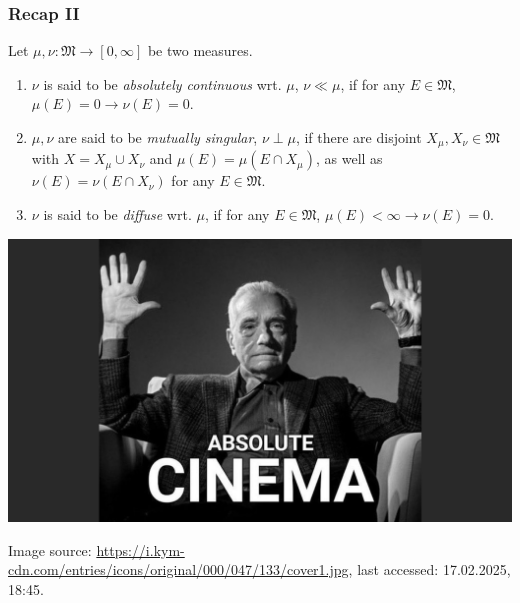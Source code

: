 \documentclass[10pt, hyperref={hidelinks}]{beamer}
\begin{document}
    \begin{frame}
        \frametitle{Recap II}

        \begin{definition} \label{def:basic_definitions}
            Let \(\mu, \nu\colon \mathfrak{M} \to [0, \infty]\) be two measures.
            \begin{enumerate}[label=(\roman*), wide]
                \item \(\nu\) is said to be \emph{absolutely continuous} wrt. \(\mu\), \(\nu \ll \mu\), if for any \(E \in \mathfrak{M}\), \(\mu(E) = 0 \rightarrow \nu(E) = 0\).
                \item \label{def:basic_definitions_2} \(\mu, \nu\) are said to be \emph{mutually singular}, \(\nu \perp \mu\), if there are disjoint \(X_\mu, X_\nu \in \mathfrak{M}\) with \(X = X_\mu \cup X_\nu\) and \(\mu(E) = \mu(E \cap X_\mu)\), as well as \(\nu(E) = \nu(E \cap X_\nu)\) for any \(E \in \mathfrak{M}\).
                \item \(\nu\) is said to be \emph{diffuse} wrt. \(\mu\), if for any \(E \in \mathfrak{M}\), \(\mu(E) < \infty \rightarrow \nu(E) = 0\).
            \end{enumerate}
        \end{definition}

        \pause

        \begin{minipage}{\linewidth}
            \centering
            \includegraphics[width=0.65\linewidth]{img/absolute_cinema.jpg}
        \end{minipage}
        {\tiny Image source: \url{https://i.kym-cdn.com/entries/icons/original/000/047/133/cover1.jpg}, last accessed: 17.02.2025, 18:45.}
    \end{frame}
\end{document}
